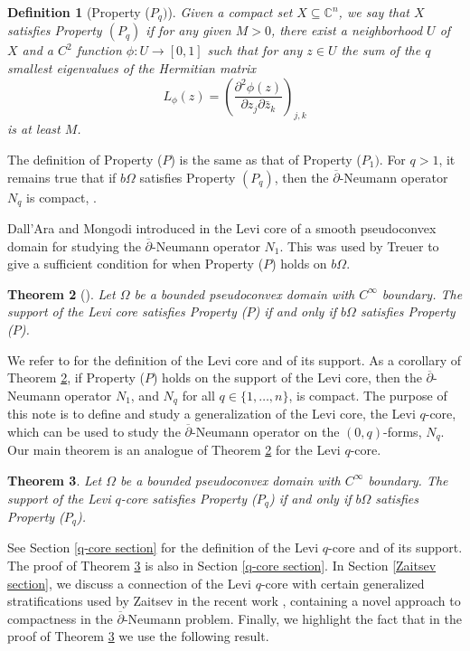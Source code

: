 \documentclass[12pt]{amsart}
\newtheorem{theorem}{Theorem}[section]
\newtheorem{definition}[theorem]{Definition}
\numberwithin{equation}{section}
{\theoremstyle{definition}
\newtheorem{remark}[theorem]{Remark}
}
\newcommand{\C}{\mathbb{C}}
\begin{document}
\begin{definition}[Property ($P_q)$]
Given a compact set $X\subseteq \C^n$, we say that $X$ satisfies Property $(P_q)$ if for any given $M>0$, there exist a neighborhood $U$ of $X$ and a $C^2$ function $\phi:U\to[0,1]$ such that for any $z\in U$ the sum of the $q$ smallest eigenvalues of the Hermitian matrix 
$$L_\phi(z)=\left(\frac{\partial^2\phi(z)}{\partial z_j\partial\bar{z}_k}\right)_{j, k}$$ 
is at least $M$.
\end{definition}
\noindent{}The definition of Property ($P$) is the same as that of Property ($P_1)$. For $q > 1$, it remains true that if $b\Omega$ satisfies Property $(P_q)$, then the $\overline{\partial}$-Neumann operator $N_q$ is compact, \cite{FuSt01, St10}. 

Dall'Ara and Mongodi introduced in \cite{DaMo21} the Levi core of a smooth pseudoconvex domain for studying the $\overline{\partial}$-Neumann operator $N_1$.  This was used by Treuer \cite{Tr22} to give a sufficient condition for when Property ($P$) holds on $b\Omega$.

\begin{theorem}[]\label{Treuer theorem}
Let $\Omega$ be a bounded pseudoconvex domain with $C^{\infty}$ boundary.  The support of the Levi core satisfies Property ($P$) if and only if $b\Omega$ satisfies Property ($P$).
\end{theorem}

We refer to \cite{DaMo21} for the definition of the Levi core and of its support. As a corollary of Theorem \ref{Treuer theorem}, if Property ($P$) holds on the support of the Levi core, then the $\overline{\partial}$-Neumann operator $N_1$, and $N_q$ for all $q \in \{1,\ldots, n\}$, is compact. The purpose of this note is to define and study a generalization of the Levi core, the Levi $q$-core, which can be used to study the $\overline{\partial}$-Neumann operator on the $(0, q)$-forms, $N_q$.  Our main theorem is an analogue of Theorem \ref{Treuer theorem} for the Levi $q$-core.  

\begin{theorem}\label{main theorem}
Let $\Omega$ be a bounded pseudoconvex domain with $C^{\infty}$ boundary.  The support of the Levi $q$-core satisfies Property ($P_q$) if and only if $b\Omega$ satisfies Property ($P_q$).
\end{theorem}

See Section \ref{q-core section} for the definition of the Levi $q$-core and of its support. The proof of Theorem \ref{main theorem} is also in Section \ref{q-core section}. In Section \ref{Zaitsev section}, we discuss a connection of the Levi $q$-core with certain generalized stratifications used by Zaitsev in the recent work \cite{Za24}, containing a novel approach to compactness in the $\overline\partial$-Neumann problem. Finally, we highlight the fact that in the proof of Theorem \ref{main theorem} we use the following result.
\end{document}
